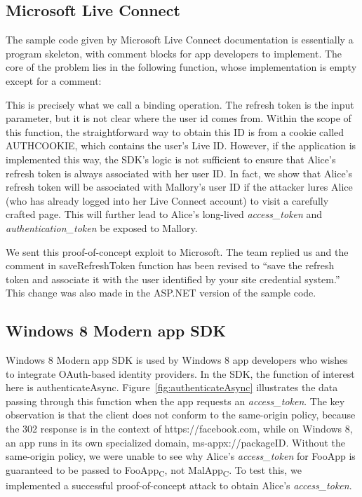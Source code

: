 \subsection{Microsoft Live Connect}

  The sample code given by Microsoft Live Connect documentation is essentially a program skeleton, with comment blocks for app developers to implement.  The core of the problem lies in the following function, whose implementation is empty except for a comment:



This is precisely what we call a binding operation. The refresh token is the input parameter, but it is not clear where the user id comes from.  Within the scope of this function, the straightforward way to obtain this ID is from a cookie called AUTHCOOKIE, which contains the user's Live ID.  However, if the application is implemented this way, the SDK's logic is not sufficient to ensure that Alice's refresh token is always associated with her user ID.  In fact, we show that Alice's refresh token will be associated with Mallory's user ID if the attacker lures Alice (who has already logged into her Live Connect account) to visit a carefully crafted page.  This will further lead to Alice's long-lived \emph{access\_token} and \emph{authentication\_token} be exposed to Mallory.

We sent this proof-of-concept exploit to Microsoft.  The team replied us and the comment in saveRefreshToken function has been revised to ``save the refresh token and associate it with the user identified by your site credential system.''  This change was also made in the ASP.NET version of the sample code.

\subsection{Windows 8 Modern app SDK}

  Windows 8 Modern app SDK is used by Windows 8 app developers who wishes to integrate OAuth-based identity providers.  In the SDK, the function of interest here is authenticateAsync.  Figure~\ref{fig:authenticateAsync} illustrates the data passing through this function when the app requests an \emph{access\_token}.  The key observation is that the client does not conform to the same-origin policy, because the 302 response is in the context of https://facebook.com, while on Windows 8, an app runs in its own specialized domain, ms-appx://packageID.  Without the same-origin policy, we were unable to see why Alice's \emph{access\_token} for FooApp is guaranteed to be passed to FooApp\textsubscript{C}, not MalApp\textsubscript{C}.  To test this, we implemented a successful proof-of-concept attack to obtain Alice's \emph{access\_token}.

